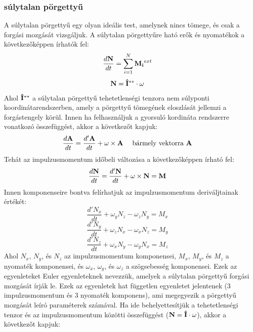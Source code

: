 \documentclass[a4paper,12pt]{article}
\begin{document}
\subsubsection*{súlytalan pörgettyű}
A súlytalan pörgettyű egy olyan ideális test, amelynek nincs tömege, és csak a forgási mozgását vizsgáljuk. A súlytalan pörgettyűre ható erők és nyomatékok a következőképpen írhatók fel:
\begin{equation}
\frac{d\bold{N}}{dt} = \sum_{i=1}^{N} \bold{M_i}^{ext}
\end{equation}
\begin{equation}
\bold{N} = \bold{\hat{I}^{**}} \cdot \bold{\omega}
\end{equation}
Ahol $\bold{\hat{I}^{**}}$ a súlytalan pörgettyű tehetetlenségi tenzora nem súlyponti koordinátarendszerben, amely a pörgettyű tömegének eloszlását jellemzi a forgástengely körül.
Innen ha felhasználjuk a gyorsuló kordináta rendszerre vonatkozó összefüggést, akkor a következőt kapjuk:
\begin{equation}
    \frac{d\bold{A}}{dt} = \frac{d'\bold{A}}{dt} + \bold{\omega} \times \bold{A} \quad \text{ bármely vektorra } \bold{A}
\end{equation}
Tehát az impulzusmomentum időbeli változása a következőképpen írható fel:
\begin{equation}
    \frac{d\bold{N}}{dt} = \frac{d'\bold{N}}{dt} + \bold{\omega} \times \bold{N} = \bold{M}
\end{equation}
Innen komponenseire bontva felírhatjuk az impulzusmomentum deriváljtainak értékét:
\begin{equation}
    \frac{d'N_x}{dt} + \omega_y N_z - \omega_z N_y = M_x
\end{equation}
\begin{equation}
    \frac{d'N_y}{dt} + \omega_z N_x - \omega_x N_z = M_y
\end{equation}
\begin{equation}
    \frac{d'N_z}{dt} + \omega_x N_y - \omega_y N_x = M_z
\end{equation}
Ahol $N_x$, $N_y$, és $N_z$ az impulzusmomentum komponensei, $M_x$, $M_y$, és $M_z$ a nyomaték komponensei, és $\omega_x$, $\omega_y$, és $\omega_z$ a szögsebesség komponensei.
Ezek az egyenleteket Euler egyenleteknek nevezzük, amelyek a súlytalan pörgettyű forgási mozgását írják le. Ezek az egyenletek hat független egyenletet jelentenek (3 impulzusmomentum és 3 nyomaték komponens), ami megegyezik a pörgettyű mozgását leíró paraméterek számával.
Ha ide behelyettesítjük a tehetetlenségi tenzor és az impulzusmomentum közötti összefüggést ($\bold{N} = \bold{\hat{I}} \cdot \bold{\omega}$), akkor a következőt kapjuk:
\end{document}

